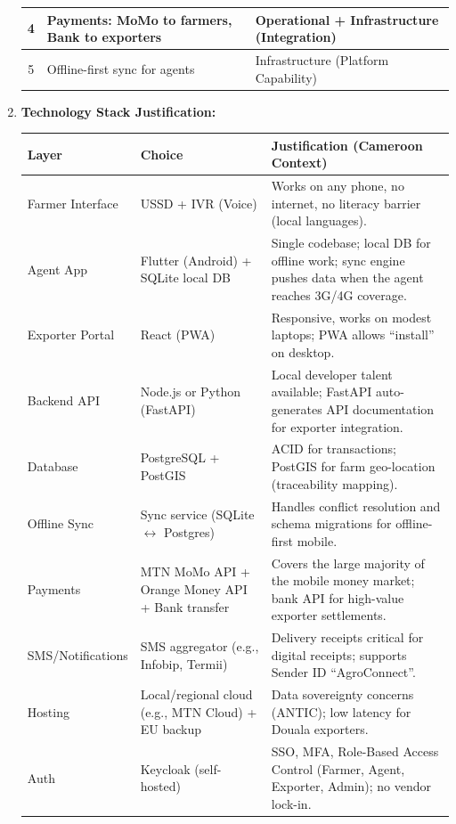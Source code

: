 \documentclass[11pt]{article}
\begin{document}
\begin{exoresolu}
\begin{enumerate}
\begin{center}
\begin{tabularx}{\linewidth}{|c|X|l|}
    4 & Payments: MoMo to farmers, Bank to exporters & Operational + Infrastructure (Integration) \\ \hline
    5 & Offline-first sync for agents & Infrastructure (Platform Capability) \\ \hline
    \end{tabularx}
    \end{center}
    \item \textbf{Technology Stack Justification:}
    \begin{center}
    \begin{tabularx}{\linewidth}{|l|l|X|}\hline
    \rowcolor{popblueL} \textbf{Layer} & \textbf{Choice} & \textbf{Justification (Cameroon Context)} \\ \hline
    Farmer Interface & USSD + IVR (Voice) & Works on any phone, no internet, no literacy barrier (local languages). \\ \hline
    Agent App & Flutter (Android) + SQLite local DB & Single codebase; local DB for offline work; sync engine pushes data when the agent reaches 3G/4G coverage. \\ \hline
    Exporter Portal & React (PWA) & Responsive, works on modest laptops; PWA allows ``install'' on desktop. \\ \hline
    Backend API & Node.js or Python (FastAPI) & Local developer talent available; FastAPI auto-generates API documentation for exporter integration. \\ \hline
    Database & PostgreSQL + PostGIS & ACID for transactions; PostGIS for farm geo-location (traceability mapping). \\ \hline
    Offline Sync & Sync service (SQLite $\leftrightarrow$ Postgres) & Handles conflict resolution and schema migrations for offline-first mobile. \\ \hline
    Payments & MTN MoMo API + Orange Money API + Bank transfer & Covers the large majority of the mobile money market; bank API for high-value exporter settlements. \\ \hline
    SMS/Notifications & SMS aggregator (e.g., Infobip, Termii) & Delivery receipts critical for digital receipts; supports Sender ID ``AgroConnect''. \\ \hline
    Hosting & Local/regional cloud (e.g., MTN Cloud) + EU backup & Data sovereignty concerns (ANTIC); low latency for Douala exporters. \\ \hline
    Auth & Keycloak (self-hosted) & SSO, MFA, Role-Based Access Control (Farmer, Agent, Exporter, Admin); no vendor lock-in. \\ \hline

\end{tabularx}
\end{center}
\end{enumerate}
\end{exoresolu}
\end{document}
